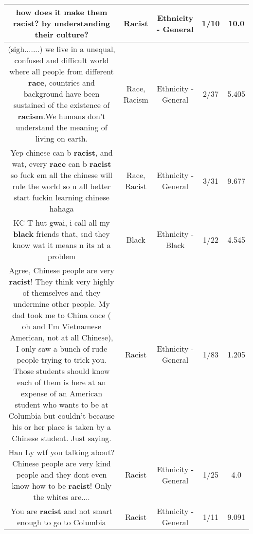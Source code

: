 \documentclass[11pt]{article}
\newlength\mylength
\begin{document}
\begin{center}
\begin{longtable}{|C{.65\mylength}|C{.30\mylength}|C{.12\mylength}|C{.12\mylength}|C{.12\mylength}|}
  \small how does it make them \textbf{racist}? by understanding their culture?\normalsize   & Racist & Ethnicity - General & 1/10 & 10.0 \\  \hline
  \small (sigh.......) we live in a unequal, confused and difficult world where  all people from different \textbf{race}, countries and background have been sustained of the existence of \textbf{racism}.We humans don't understand the meaning of living on earth.\normalsize   & Race, Racism & Ethnicity - General & 2/37 & 5.405 \\  \hline
  \small Yep chinese can b \textbf{racist}, and wat, every \textbf{race} can b \textbf{racist} so fuck em all the chinese will rule the world so u all better start fuckin learning chinese hahaga\normalsize   & Race, Racist & Ethnicity - General & 3/31 & 9.677 \\  \hline
  \small KC T hut gwai, i call all my \textbf{black} friends that, snd they know wat it means n its nt a problem\normalsize   & Black & Ethnicity - Black & 1/22 & 4.545 \\  \hline
  \small Agree, Chinese people are very \textbf{racist}! They think very highly of themselves and they undermine other people. My dad took me to China once ( oh and I'm Vietnamese American, not at all Chinese), I only saw a bunch of rude people trying to trick you. Those students should know each of them is here at an expense of an American student who wants to be at Columbia but couldn't because his or her place is taken by a Chinese student. Just saying.\normalsize   & Racist & Ethnicity - General & 1/83 & 1.205 \\  \hline
  \small Han Ly wtf you talking about? Chinese people are very kind people and they dont even know how to be \textbf{racist}! Only the whites are....\normalsize   & Racist & Ethnicity - General & 1/25 & 4.0 \\  \hline
  \small You are \textbf{racist} and not smart enough to go to Columbia\normalsize   & Racist & Ethnicity - General & 1/11 & 9.091 \\  \hline

\end{longtable}
\end{center}
\end{document}
